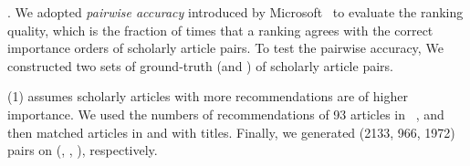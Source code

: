 .
We adopted {\em pairwise accuracy} introduced by Microsoft~\cite{Richardson06:BPR,wsdmcup} to evaluate the ranking quality, which is the fraction of times that a ranking agrees with the correct importance orders of scholarly article pairs.
%
To test the pairwise accuracy, We constructed two sets of ground-truth (\recom and \fcita) of scholarly article pairs.

\noindent
(1) \recom assumes scholarly articles with more recommendations are of higher importance.
We used the numbers of recommendations of 93 articles in \aan~\cite{Liang16AAAI}, %
and then matched articles in \aminer and \magdata with titles. %
Finally, we generated (2133, 966, 1972) pairs on (\aan, \aminer, \magdata), respectively.


